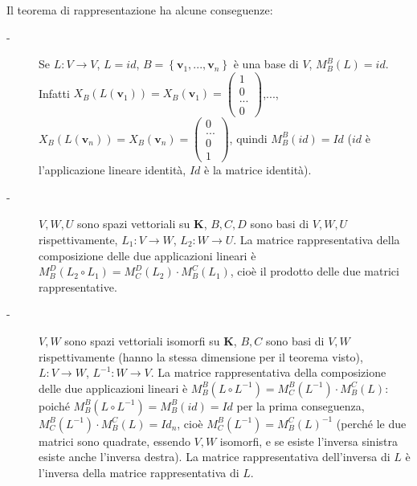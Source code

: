 \documentclass{article}
\begin{document}
Il teorema di rappresentazione ha alcune conseguenze:

\begin{description}
\item[-] Se $L:V\rightarrow V$, $L=id$, $B=\left\{ \mathbf{v}_{1},...,%
\mathbf{v}_{n}\right\} $ \`{e} una base di $V$, $M_{B}^{B}\left( L\right)
=id $. Infatti $X_{B}\left( L\left( \mathbf{v}_{1}\right) \right)
=X_{B}\left( \mathbf{v}_{1}\right) =\left( 
\begin{array}{c}
1 \\ 
0 \\ 
... \\ 
0%
\end{array}%
\right) $,..., $X_{B}\left( L\left( \mathbf{v}_{n}\right) \right)
=X_{B}\left( \mathbf{v}_{n}\right) =\left( 
\begin{array}{c}
0 \\ 
... \\ 
0 \\ 
1%
\end{array}%
\right) $, quindi $M_{B}^{B}\left( id\right) =Id$ ($id$ \`{e} l'applicazione
lineare identit\`{a}, $Id$ \`{e} la matrice identit\`{a}).

\item[-] $V,W,U$ sono spazi vettoriali su $\mathbf{K}$, $B,C,D$ sono basi di 
$V,W,U$ rispettivamente, $L_{1}:V\rightarrow W$, $L_{2}:W\rightarrow U$. La
matrice rappresentativa della composizione delle due applicazioni lineari 
\`{e} $M_{B}^{D}\left( L_{2}\circ L_{1}\right) =M_{C}^{D}\left( L_{2}\right)
\cdot M_{B}^{C}\left( L_{1}\right) $, cio\`{e} il prodotto delle due matrici
rappresentative.

\item[-] $V,W$ sono spazi vettoriali isomorfi su $\mathbf{K}$, $B,C$ sono
basi di $V,W$ rispettivamente (hanno la stessa dimensione per il teorema
visto), $L:V\rightarrow W$, $L^{-1}:W\rightarrow V$. La matrice
rappresentativa della composizione delle due applicazioni lineari \`{e} $%
M_{B}^{B}\left( L\circ L^{-1}\right) =M_{C}^{B}\left( L^{-1}\right) \cdot
M_{B}^{C}\left( L\right) $: poich\'{e} $M_{B}^{B}\left( L\circ L^{-1}\right)
=M_{B}^{B}\left( id\right) =Id$ per la prima conseguenza, $M_{C}^{B}\left(
L^{-1}\right) \cdot M_{B}^{C}\left( L\right) =Id_{n}$, cio\`{e} $%
M_{C}^{B}\left( L^{-1}\right) =M_{B}^{C}\left( L\right) ^{-1}$ (perch\'{e}
le due matrici sono quadrate, essendo $V,W$ isomorfi, e se esiste l'inversa
sinistra esiste anche l'inversa destra). La matrice rappresentativa
dell'inversa di $L$ \`{e} l'inversa della matrice rappresentativa di $L$.


\end{description}
\end{document}
